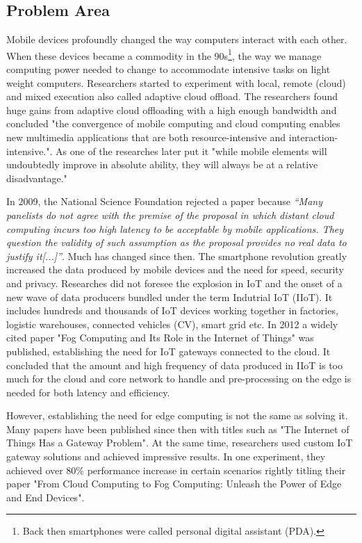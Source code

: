 \subsection{Problem Area}\label{sec:problemArea}
{
Mobile devices profoundly changed the way computers interact with each other. When these devices became a commodity in the 90s\footnote{Back then smartphones were called personal digital assistant (PDA).}, the way we manage computing power needed to change to accommodate intensive tasks on light weight computers. Researchers started to experiment with local, remote (cloud) and mixed execution also called adaptive cloud offload. The researchers found huge gains from adaptive cloud offloading with a high enough bandwidth and concluded "the convergence of mobile computing and cloud computing enables new multimedia applications that are both resource-intensive and interaction-intensive."\cite{noble1997agileIoTGatewayOdyssey}. As one of the researches later put it "while mobile elements will undoubtedly improve in absolute ability, they will always be at a relative disadvantage."\cite{satyanarayanan2015briefHistoryIoTGateway}


In 2009, the National Science Foundation rejected a paper because \textit{``Many panelists do not agree with the premise of the proposal in which distant cloud computing incurs too high latency to be acceptable by mobile applications. They question the validity of such assumption as the proposal provides no real data to justify it[...]''}\cite{satyanarayanan2015briefHistoryIoTGateway}. Much has changed since then. The smartphone revolution greatly increased the data produced by mobile devices and the need for speed, security and privacy. Researches did not foresee the explosion in IoT and the onset of a new wave of data producers bundled under the term Indutrial IoT (IIoT). It includes hundreds and thousands of IoT devices working together in factories, logistic warehouses, connected vehicles (CV), smart grid etc. In 2012 a widely cited paper "Fog Computing and Its Role in the Internet of Things"\cite{fogComputing:def} was published, establishing the need for IoT gateways connected to the cloud. It concluded that the amount and high frequency of data produced in IIoT is too much for the cloud and core network to handle and pre-processing on the edge is needed for both latency and efficiency.


However, establishing the need for edge computing is not the same as solving it. Many papers have been published since then with titles such as "The Internet of Things Has a Gateway Problem"\cite{zachariah2015internetOfThingsHasGatewayProblem}. At the same time, researchers used custom IoT gateway solutions and achieved impressive results. In one experiment, they achieved over 80\% performance increase in certain scenarios rightly titling their paper "From Cloud Computing to Fog Computing: Unleash the Power of Edge and End Devices"\cite{hong2017fromCloudtoIoTGatewayUnleashingTHePower}.


}
